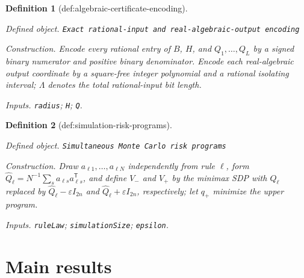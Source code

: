 \documentclass{article}
\newtheorem{definition}{Definition}
\begin{document}
\begin{definition}[def:algebraic-certificate-encoding]\label{def:algebraic-certificate-encoding}
\par\smallskip\noindent\emph{Defined object.} \texttt{Exact rational-\allowbreak{}input and real-\allowbreak{}algebraic-\allowbreak{}output encoding}
\par\smallskip\noindent\emph{Construction.} Encode every rational entry of \(B\), \(H\), and \(Q_1,\ldots,Q_L\) by a signed binary numerator and positive binary denominator. Encode each real-algebraic output coordinate by a square-free integer polynomial and a rational isolating interval; \(\Lambda\) denotes the total rational-input bit length.
\par\smallskip\noindent\emph{Inputs.} \texttt{radius}; \texttt{H}; \texttt{Q}.
\end{definition}

\begin{definition}[def:simulation-risk-programs]\label{def:simulation-risk-programs}
\par\smallskip\noindent\emph{Defined object.} \texttt{Simultaneous Monte Carlo risk programs}
\par\smallskip\noindent\emph{Construction.} Draw \(a_{\ell1},\ldots,a_{\ell N}\) independently from rule \(\ell\), form \(\widehat Q_{\ell}=N^{-1}\sum_sa_{\ell s}a_{\ell s}^{\mathsf T}\), and define \(V_{-}\) and \(V_{+}\) by the minimax SDP with \(Q_{\ell}\) replaced by \(\widehat Q_{\ell}-\varepsilon I_{2n}\) and \(\widehat Q_{\ell}+\varepsilon I_{2n}\), respectively; let \(q_{+}\) minimize the upper program.
\par\smallskip\noindent\emph{Inputs.} \texttt{ruleLaw}; \texttt{simulationSize}; \texttt{epsilon}.
\end{definition}

\section{Main results}
\end{document}
